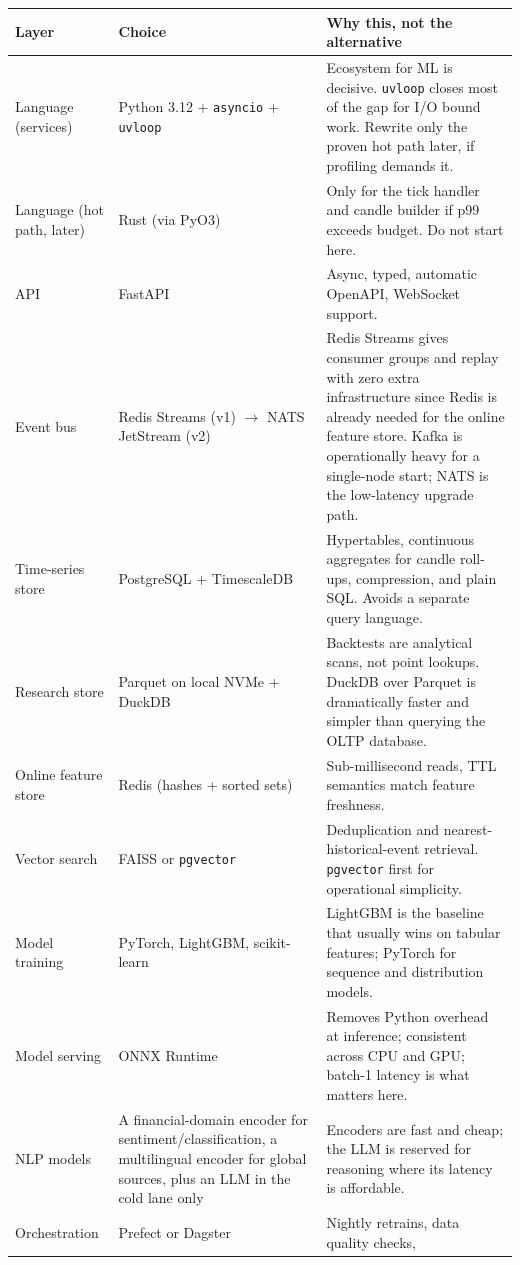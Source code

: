 \begin{longtable}{@{}p{3.0cm}p{4.0cm}p{7.4cm}@{}}
\toprule
\textbf{Layer} & \textbf{Choice} & \textbf{Why this, not the alternative}\\
\midrule
Language (services) & Python 3.12 + \texttt{asyncio} + \texttt{uvloop} &
Ecosystem for ML is decisive. \texttt{uvloop} closes most of the gap for I/O
bound work. Rewrite only the proven hot path later, if profiling demands it.\\
Language (hot path, later) & Rust (via PyO3) & Only for the tick handler and
candle builder if p99 exceeds budget. Do not start here.\\
API & FastAPI & Async, typed, automatic OpenAPI, WebSocket support.\\
Event bus & Redis Streams (v1) $\to$ NATS JetStream (v2) & Redis Streams gives
consumer groups and replay with zero extra infrastructure since Redis is
already needed for the online feature store. Kafka is operationally heavy for a
single-node start; NATS is the low-latency upgrade path.\\
Time-series store & PostgreSQL + TimescaleDB & Hypertables, continuous
aggregates for candle roll-ups, compression, and plain SQL. Avoids a separate
query language.\\
Research store & Parquet on local NVMe + DuckDB & Backtests are analytical
scans, not point lookups. DuckDB over Parquet is dramatically faster and
simpler than querying the OLTP database.\\
Online feature store & Redis (hashes + sorted sets) & Sub-millisecond reads,
TTL semantics match feature freshness.\\
Vector search & FAISS or \texttt{pgvector} & Deduplication and
nearest-historical-event retrieval. \texttt{pgvector} first for operational
simplicity.\\
Model training & PyTorch, LightGBM, scikit-learn & LightGBM is the baseline that
usually wins on tabular features; PyTorch for sequence and distribution models.\\
Model serving & ONNX Runtime & Removes Python overhead at inference; consistent
across CPU and GPU; batch-1 latency is what matters here.\\
NLP models & A financial-domain encoder for sentiment/classification, a
multilingual encoder for global sources, plus an LLM in the cold lane only &
Encoders are fast and cheap; the LLM is reserved for reasoning where its latency
is affordable.\\
Orchestration & Prefect or Dagster & Nightly retrains, data quality checks,

\end{longtable}
